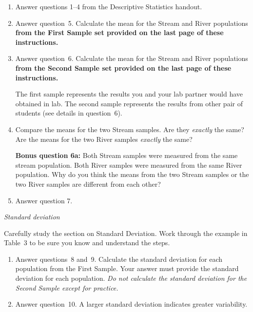 \documentclass[12pt]{exam}
\begin{document}
\begin{enumerate}
\item Answer questions 1–4 from the Descriptive Statistics handout.

\item Answer question~5. Calculate the mean for the Stream and River populations \textbf{from the First Sample set provided on the last page of these instructions.} 

\item Answer question~6. Calculate the mean for the Stream and River populations \textbf{from the Second Sample set provided on the last page of these instructions.}

The first sample represents the results you and your lab partner would have obtained in lab. The second sample represents the results from other pair of students (see details in question~6).


\item Compare the means for the two Stream samples. Are they \emph{exactly} the same? Are the means for the two River samples \emph{exactly} the same?

\textbf{Bonus question 6a:} Both Stream samples were measured from the same stream population. Both River samples were measured from the same River population. Why do you think the means from the two Stream samples or the two River samples are different from each other?  

\item Answer question 7.

\end{enumerate}

\bigskip

\emph{Standard deviation}

Carefully study the section on Standard Deviation. Work through the example in Table~3 to be sure you know and understand the steps.

\begin{enumerate}[resume]
\item Answer questions~8 and~9. Calculate the standard deviation for each population from the First Sample. Your answer must provide the standard deviation for each population. \emph{Do not calculate the standard deviation for the Second Sample except for practice.}


\item Answer question~10. A larger standard deviation indicates greater variability.


\end{enumerate}
\end{document}
